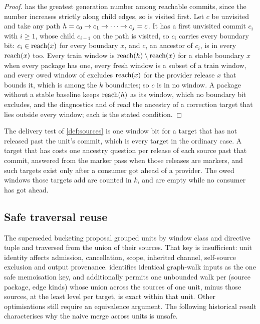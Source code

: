 \begin{proof}
\Head{} has the greatest generation number among reachable commits, since the
number increases strictly along child edges, so \Head{} is visited first. Let
$c$ be unvisited and take any path $h = c_0 \to c_1 \to \dots \to c_j =
c$. It has a first unvisited commit $c_i$ with $i \ge 1$, whose child $c_{i-1}$
on the path is visited, so $c_i$ carries every boundary bit: $c_i \in \mathrm{reach}(x)$
for every boundary $x$, and $c$, an ancestor of $c_i$, is in every $\mathrm{reach}(x)$
too. Every train window is $\mathrm{reach}(h) \setminus \mathrm{reach}(x)$ for a stable
boundary $x$ when every package has one, every fresh window is a subset of a
train window, and every owed window of  excludes $\mathrm{reach}(x)$ for the
provider release $x$ that bounds it, which is among the $k$ boundaries; so $c$
is in no window. A package without a stable baseline keeps $\mathrm{reach}(h)$ as
its window, which no boundary bit excludes, and the diagnostics 
and  of  read the ancestry of a correction target that
lies outside every window; each is the stated condition.
\end{proof}

\begin{remark}
\label{rem:delivery-cost}
The delivery test of \cref{def:sources} is one window bit for a target that
has not released past the unit's commit, which is every target in the ordinary
case. A target that has costs one ancestry question per release of each source
past that commit, answered from the marker pass when those releases are
markers, and such targets exist only after a consumer got ahead of a provider.
The owed windows those targets add are counted in $k$, and are empty while no
consumer has got ahead.
\end{remark}

\subsection{Safe traversal reuse}

The superseded bucketing proposal grouped units by window class and directive
tuple and traversed from the union of their sources. That key is insufficient:
unit identity affects admission, cancellation, scope, inherited channel,
self-source exclusion and output provenance.  identifies identical
graph-walk inputs as the one safe memoisation key, and additionally permits
one unbounded walk per (source package, edge kinds) whose union across the
sources of one unit, minus those sources, at the least level per target, is
exact within that unit. Other optimisations still require an equivalence
argument. The following historical result characterises why the naive merge
across units is unsafe.


